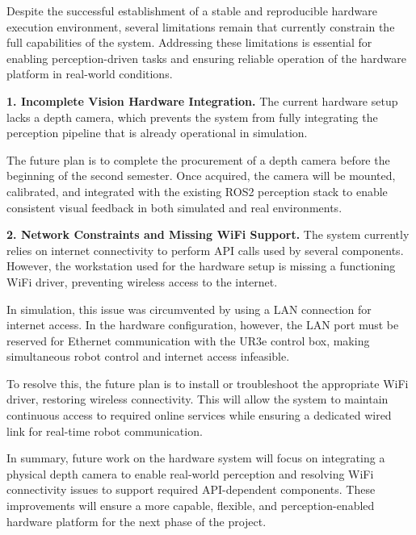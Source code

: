 \documentclass[12pt]{extarticle}
\begin{document}
Despite the successful establishment of a stable and reproducible hardware execution environment, several limitations remain that currently constrain the full capabilities of the system. Addressing these limitations is essential for enabling perception-driven tasks and ensuring reliable operation of the hardware platform in real-world conditions.

\textbf{1. Incomplete Vision Hardware Integration.}  
The current hardware setup lacks a depth camera, which prevents the system from fully integrating the perception pipeline that is already operational in simulation. 

The future plan is to complete the procurement of a depth camera before the beginning of the second semester. Once acquired, the camera will be mounted, calibrated, and integrated with the existing ROS2 perception stack to enable consistent visual feedback in both simulated and real environments.

\textbf{2. Network Constraints and Missing WiFi Support.}  
The system currently relies on internet connectivity to perform API calls used by several components. However, the workstation used for the hardware setup is missing a functioning WiFi driver, preventing wireless access to the internet.

In simulation, this issue was circumvented by using a LAN connection for internet access. In the hardware configuration, however, the LAN port must be reserved for Ethernet communication with the UR3e control box, making simultaneous robot control and internet access infeasible.

To resolve this, the future plan is to install or troubleshoot the appropriate WiFi driver, restoring wireless connectivity. This will allow the system to maintain continuous access to required online services while ensuring a dedicated wired link for real-time robot communication.

In summary, future work on the hardware system will focus on integrating a physical depth camera to enable real-world perception and resolving WiFi connectivity issues to support required API-dependent components. These improvements will ensure a more capable, flexible, and perception-enabled hardware platform for the next phase of the project.

\newpage


\end{document}
